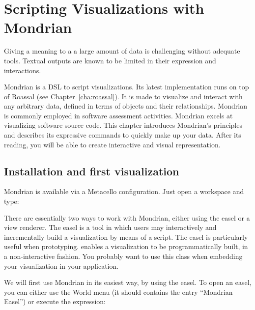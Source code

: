 \documentclass[a4paper,10pt,twoside]{book}
\begin{document}
\fi
\sloppy
\chapter{Scripting Visualizations with Mondrian}


Giving a meaning to a a large amount of data is challenging without adequate tools. Textual outputs are known to be limited in their expression and interactions. 

Mondrian is a DSL to script visualizations. Its latest implementation runs on top of Roassal (see Chapter~\ref{cha:roassal}).  
It is made to visualize and interact with any arbitrary data, defined in terms of objects and their relationships. Mondrian is commonly employed in software assessment activities. Mondrian excels at visualizing software source code. This chapter introduces Mondrian's principles and describes its expressive commands to quickly make up your data. After its reading, you will be able to create interactive and visual representation.


\section{Installation and first visualization}

Mondrian is available via a Metacello configuration. Just open a workspace and type:

\begin{code}{}


\end{code}

There are essentially two ways to work with Mondrian, either using the easel or a view renderer. 
The easel is a tool in which users may interactively and incrementally build a visualization by means of a script.  The easel is particularly useful when prototyping.
 enables a visualization to be programmatically built, in a non-interactive fashion. You probably want to use this class when embedding your visualization in your application.

We will first use Mondrian in its easiest way, by using the easel. To open an easel, you can either use the World menu (it should contains the entry ``Mondrian Easel'') or execute the expression:
\end{document}
